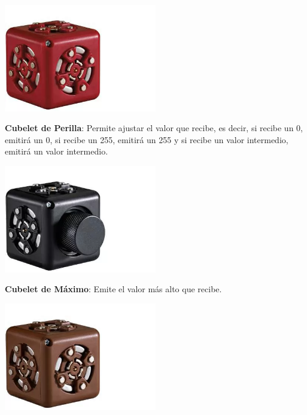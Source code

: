 \begin{itemize}
        \begin{minipage}
            {0.5\textwidth}
            \centering
            \includegraphics[width=0.5\textwidth]{./images/marco_teorico/cubelets/inversor.png}
        \end{minipage}
        \begin{minipage}
            {0.5\textwidth}
            \item \textbf{Cubelet de Perilla}: Permite ajustar el valor que recibe, es decir, si recibe
                un 0, emitir\'a un 0, si recibe un 255, emitir\'a un 255 y si recibe un valor intermedio,
                emitir\'a un valor intermedio.
        \end{minipage}
        \begin{minipage}
            {0.5\textwidth}
            \centering
            \includegraphics[width=0.5\textwidth]{./images/marco_teorico/cubelets/perilla.png}
        \end{minipage}
        \begin{minipage}
            {0.5\textwidth}
            \item \textbf{Cubelet de M\'aximo}: Emite el valor m\'as alto que recibe.
        \end{minipage}
        \begin{minipage}
            {0.5\textwidth}
            \centering
            \includegraphics[width=0.5\textwidth]{./images/marco_teorico/cubelets/maximo.png}

\end{minipage}
\end{itemize}

